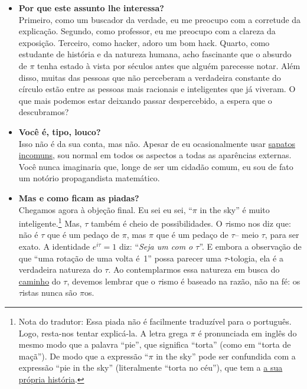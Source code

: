 \begin{itemize}
  \item \textbf{Por que este assunto lhe interessa?} \\ Primeiro, como um buscador da verdade, eu me preocupo com a corretude da explicação. Segundo, como professor, eu me preocupo com a clareza da exposição. Terceiro, como hacker, adoro um bom hack. Quarto, como estudante de história e da natureza humana, acho fascinante que o absurdo de $\pi$ tenha estado à vista por séculos antes que alguém parecesse notar. Além disso, muitas das pessoas que não perceberam a verdadeira constante do círculo estão entre as pessoas mais racionais e inteligentes que já viveram. O que mais podemos estar deixando passar despercebido, a espera que o descubramos?

  \item \textbf{Você é, tipo, louco?} \\ Isso não é da sua conta, mas não. Apesar de eu ocasionalmente usar \href{https://en.wikipedia.org/wiki/Vibram_FiveFingers}{sapatos incomuns}, sou normal em todos os aspectos a todas as aparências externas. Você nunca imaginaria que, longe de ser um cidadão comum, eu sou de fato um notório propagandista matemático.

  \item \textbf{Mas e como ficam as piadas?} \\ Chegamos agora à objeção final. Eu sei eu sei, ``$\pi$ in the sky'' é muito inteligente.\footnote{Nota do tradutor: Essa piada não é facilmente traduzível para o português. Logo, resta-nos tentar explicá-la. A letra grega $\pi$ é pronunciada em inglês do mesmo modo que a palavra ``pie'', que significa ``torta'' (como em ``torta de maçã''). De modo que a expressão ``$\pi$ in the sky'' pode ser confundida com a expressão ``pie in the sky'' (literalmente ``torta no céu''), que tem a \href{https://en.wiktionary.org/wiki/pie_in_the_sky}{a sua própria história}.} Mas, $\tau$ também é cheio de possibilidades. O $\tau$ismo nos diz que: não é $\tau$ que é um pedaço de $\pi$, mas $\pi$ que é um pedaço de $\tau$-- meio $\tau$, para ser exato. A identidade $e^{i\tau} = 1$ diz: ``\emph{Seja um com o $\tau$}''. E embora a observação de que ``uma rotação de uma volta é~1'' possa parecer uma $\tau$-tologia, ela é a verdadeira natureza do $\tau$. Ao contemplarmos essa natureza em busca do \href{https://pt.wikipedia.org/wiki/Tao}{caminho} do $\tau$, devemos lembrar que o $\tau$ismo é baseado na razão, não na fé: os $\tau$istas nunca são $\pi$os.

\end{itemize}

